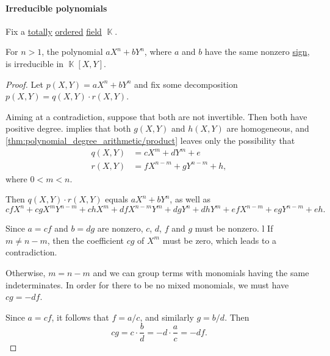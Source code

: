 \paragraph{Irreducible polynomials}

\begin{proposition}\label{thm:axn_byn_irreducible}
  Fix a \hyperref[def:totally_ordered_set]{totally} \hyperref[def:ordered_semiring]{ordered} \hyperref[def:field]{field} \( \BbbK \).

  For \( n > 1 \), the polynomial \( a X^n + b Y^n \), where \( a \) and \( b \) have the same nonzero \hyperref[def:signum]{sign}, is irreducible in \( \BbbK[X, Y] \).
\end{proposition}
\begin{proof}
  Let \( p(X, Y) = a X^n + b Y^n \) and fix some decomposition \( p(X, Y) = q(X, Y) \cdot r(X, Y) \).

  Aiming at a contradiction, suppose that both are not invertible. Then both have positive degree.  implies that both \( g(X, Y) \) and \( h(X, Y) \) are homogeneous, and \cref{thm:polynomial_degree_arithmetic/product} leaves only the possibility that
  \begin{align*}
    q(X, Y) &= c X^m + d Y^m + e \\
    r(X, Y) &= f X^{n-m} + g Y^{n-m} + h,
  \end{align*}
  where \( 0 < m < n \).

  Then \( q(X, Y) \cdot r(X, Y) \) equals \( a X^n + b Y^n \), as well as
  \begin{equation*}
    c f X^n + c g X^m Y^{n-m} + c h X^m + d f X^{n-m} Y^m + d g Y^n + d h Y^m + e f X^{n-m} + e g Y^{n-m} + e h.
  \end{equation*}

  Since \( a = c f \) and \( b = d g \) are nonzero, \( c \), \( d \), \( f \) and \( g \) must be nonzero.
l
  If \( m \neq n - m \), then the coefficient \( c g \) of \( X^m \) must be zero, which leads to a contradiction.

  Otherwise, \( m = n - m \) and we can group terms with monomials having the same indeterminates. In order for there to be no mixed monomials, we must have \( c g = - d f \).

  Since \( a = c f \), it follows that \( f = a / c \), and similarly \( g = b / d \). Then
  \begin{equation*}
    c g = c \cdot \frac b d = - d \cdot \frac a c = - d f.
  \end{equation*}


\end{proof}
